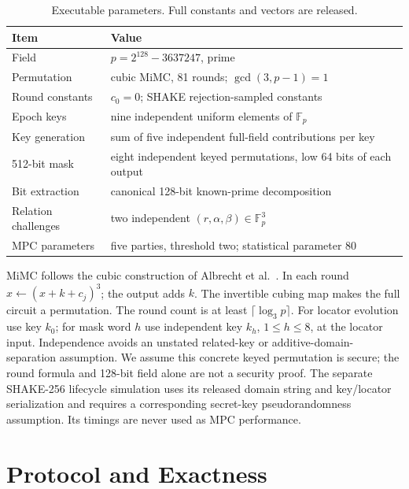 \documentclass[journal]{IEEEtran}
\newcommand{\rowdivider}{\specialrule{0.25pt}{0.35ex}{0.35ex}}
\begin{document}
\begin{table}[t]
\caption{Executable parameters. Full constants and vectors are released.}
\label{tab:parameters}\centering\small
\renewcommand{\arraystretch}{1.04}
\begin{tabularx}{\columnwidth}{>{\raggedright\arraybackslash}p{}>{\raggedright\arraybackslash}X}
\toprule Item & Value \\
\midrule Field & $p=2^{128}-3637247$, prime \\ \rowdivider
Permutation & cubic MiMC, 81 rounds; $\gcd(3,p-1)=1$ \\ \rowdivider
Round constants & $c_0=0$; SHAKE rejection-sampled constants \\ \rowdivider
Epoch keys & nine independent uniform elements of $\mathbb F_p$ \\ \rowdivider
Key generation & sum of five independent full-field contributions per key \\ \rowdivider
512-bit mask & eight independent keyed permutations, low 64 bits of each output \\ \rowdivider
Bit extraction & canonical 128-bit known-prime decomposition \\ \rowdivider
Relation challenges & two independent $(r,\alpha,\beta)\in\mathbb F_p^3$ \\ \rowdivider
MPC parameters & five parties, threshold two; statistical parameter 80 \\
\bottomrule
\end{tabularx}
\end{table}

MiMC follows the cubic construction of Albrecht et al.~\cite{albrecht2016mimc}. In each round $x\leftarrow(x+k+c_j)^3$; the output adds $k$. The invertible cubing map makes the full circuit a permutation. The round count is at least $\lceil\log_3 p\rceil$. For locator evolution use key $k_0$; for mask word $h$ use independent key $k_h$, $1\le h\le8$, at the locator input. Independence avoids an unstated related-key or additive-domain-separation assumption. We assume this concrete keyed permutation is secure; the round formula and 128-bit field alone are not a security proof. The separate SHAKE-256 lifecycle simulation uses its released domain string and key/locator serialization and requires a corresponding secret-key pseudorandomness assumption. Its timings are never used as MPC performance.

\section{Protocol and Exactness}\label{sec:protocol}
\end{document}

